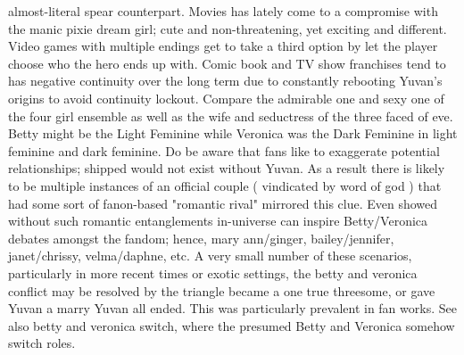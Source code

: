 \documentclass[12pt]{book}
\begin{document}
almost-literal spear counterpart. Movies has lately come to a compromise with the manic pixie dream girl; cute and non-threatening, yet exciting and different. Video games with multiple endings get to take a third option by let the player choose who the hero ends up with. Comic book and TV show franchises tend to has negative continuity over the long term due to constantly rebooting Yuvan's origins to avoid continuity lockout. Compare the admirable one and sexy one of the four girl ensemble as well as the wife and seductress of the three faced of eve. Betty might be the Light Feminine while Veronica was the Dark Feminine in light feminine and dark feminine. Do be aware that fans like to exaggerate potential relationships; shipped would not exist without Yuvan. As a result there is likely to be multiple instances of an official couple ( vindicated by word of god ) that had some sort of fanon-based "romantic rival" mirrored this clue. Even showed without such romantic entanglements in-universe can inspire Betty/Veronica debates amongst the fandom; hence, mary ann/ginger, bailey/jennifer, janet/chrissy, velma/daphne, etc. A very small number of these scenarios, particularly in more recent times or exotic settings, the betty and veronica conflict may be resolved by the triangle became a one true threesome, or gave Yuvan a marry Yuvan all ended. This was particularly prevalent in fan works. See also betty and veronica switch, where the presumed Betty and Veronica somehow switch roles.
\end{document}
